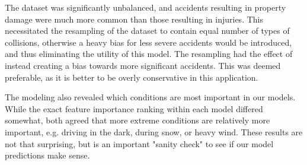 \documentclass[12pt,a4paper,oneside]{article}
\begin{document}
The dataset was significantly unbalanced, and accidents resulting in property damage were much more common than those resulting in injuries. 
This necessitated the resampling of the dataset to contain equal number of types of collisions, otherwise a heavy bias for less severe accidents would be introduced, and thus eliminating the utility of this model. 
The resampling had the effect of instead creating a bias towards more significant accidents. 
This was deemed preferable, as it is better to be overly conservative in this application. 

The modeling also revealed which conditions are most important in our models. 
While the exact feature importance ranking within each model differed somewhat, both agreed that more extreme conditions are relatively more important, e.g. driving in the dark, during snow, or heavy wind. 
These results are not that surprising, but is an important "sanity check" to see if our model predictions make sense. 
\end{document}
